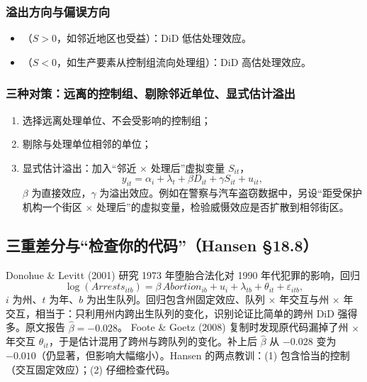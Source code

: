 \subsubsection{溢出方向与偏误方向}

\begin{itemize}
  \item {}（$S>0$，如邻近地区也受益）：DiD 低估处理效应。
  \item {}（$S<0$，如生产要素从控制组流向处理组）：DiD 高估处理效应。
\end{itemize}

\subsubsection{三种对策：远离的控制组、剔除邻近单位、显式估计溢出}

\begin{enumerate}
  \item 选择远离处理单位、不会受影响的控制组；
  \item 剔除与处理单位相邻的单位；
  \item 显式估计溢出：加入“邻近 $\times$ 处理后”虚拟变量 $S_{it}$，
  \[
  y_{it}=\alpha_i+\lambda_t+\beta D_{it}+\gamma S_{it}+u_{it},
  \]
  $\beta$ 为直接效应，$\gamma$ 为溢出效应。例如在警察与汽车盗窃数据中，另设“距受保护机构一个街区 $\times$ 处理后”的虚拟变量，检验威慑效应是否扩散到相邻街区。
\end{enumerate}

\subsection{三重差分与“检查你的代码”（Hansen \S18.8）}

\begin{exmp}\label{ex:U15b-ddd}
Donohue \& Levitt (2001) 研究 1973 年堕胎合法化对 1990 年代犯罪的影响，回归
\[
\log(\mathit{Arrests}_{itb})=\beta\,\mathit{Abortion}_{ib}+u_i+\lambda_{tb}+\theta_{it}+\varepsilon_{itb},
\]
$i$ 为州、$t$ 为年、$b$ 为出生队列。回归包含州固定效应、队列 $\times$ 年交互与州 $\times$ 年交互，相当于：只利用州内跨出生队列的变化，识别论证比简单的跨州 DiD 强得多。原文报告 $\hat\beta=-0.028$。
\solution Foote \& Goetz (2008) 复制时发现原代码漏掉了州 $\times$ 年交互 $\theta_{it}$，于是估计混用了跨州与跨队列的变化。补上后 $\hat\beta$ 从 $-0.028$ 变为 $-0.010$（仍显著，但影响大幅缩小）。Hansen 的两点教训：(1) 包含恰当的控制（交互固定效应）；(2) 仔细检查代码。
\end{exmp}

